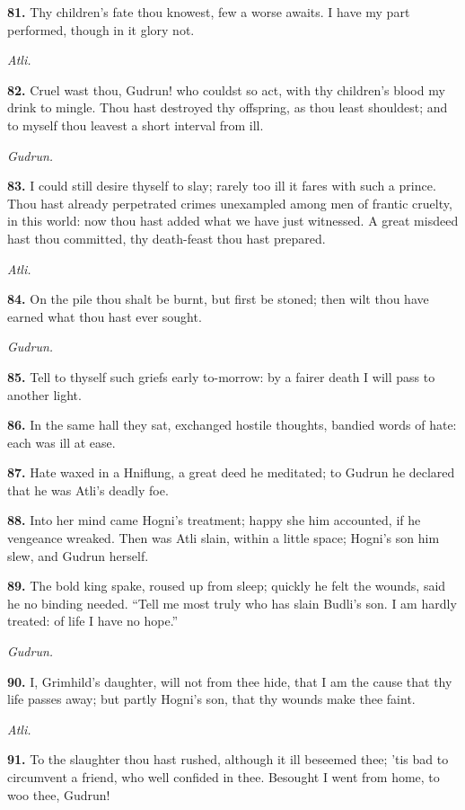 \textbf{81.} Thy children's fate thou knowest, few a worse awaits. I have my
part performed, though in it glory not.

\emph{Atli.}

\textbf{82.} Cruel wast thou, Gudrun! who couldst so act, with thy children's
blood my drink to mingle. Thou hast destroyed thy offspring, as thou
least shouldest; and to myself thou leavest a short interval from ill.

\emph{Gudrun.}

\textbf{83.} I could still desire thyself to slay; rarely too ill it fares
with such a prince. Thou hast already perpetrated crimes unexampled
among men of frantic cruelty, in this world: now thou hast added what
we have just witnessed. A great misdeed hast thou committed, thy
death-feast thou hast prepared.

\emph{Atli.}

\textbf{84.} On the pile thou shalt be burnt, but first be stoned; then wilt
thou have earned what thou hast ever sought.

\emph{Gudrun.}

\textbf{85.} Tell to thyself such griefs early to-morrow: by a fairer death I
will pass to another light.

\textbf{86.} In the same hall they sat, exchanged hostile thoughts, bandied
words of hate: each was ill at ease.

\textbf{87.} Hate waxed in a Hniflung, a great deed he meditated; to Gudrun
he declared that he was Atli's deadly foe.

\textbf{88.} Into her mind came Hogni's treatment; happy she him accounted,
if he vengeance wreaked. Then was Atli slain, within a little space;
Hogni's son him slew, and Gudrun herself.

\textbf{89.} The bold king spake, roused up from sleep; quickly he felt the
wounds, said he no binding needed. ``Tell me most truly who has slain
Budli's son. I am hardly treated: of life I have no hope.''

\emph{Gudrun.}

\textbf{90.} I, Grimhild's daughter, will not from thee hide, that I am the
cause that thy life passes away; but partly Hogni's son, that thy
wounds make thee faint.

\emph{Atli.}

\textbf{91.} To the slaughter thou hast rushed, although it ill beseemed
thee; 'tis bad to circumvent a friend, who well confided in thee.
Besought I went from home, to woo thee, Gudrun!

